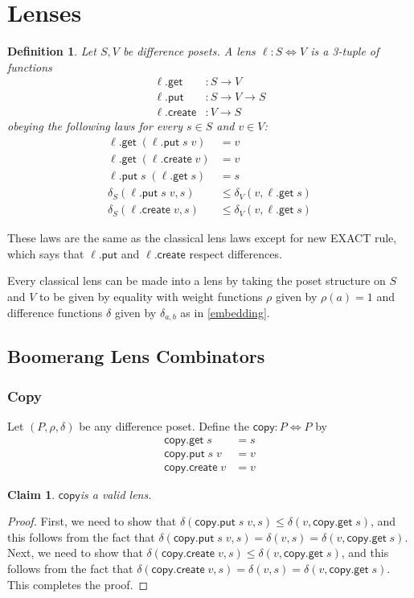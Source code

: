 \documentclass[acmsmall,review,anonymous]{acmart}\settopmatter{printfolios=true,printccs=false,printacmref=false}
\newtheorem{definition}{Definition}
\newtheorem{claim}{Claim}
\newcommand{\kw}[1]{\ensuremath{\mathsf{#1}}}
\newcommand{\get}{\ensuremath{\kw{get}}}
\newcommand{\pput}{\ensuremath{\kw{put}}}
\newcommand{\create}{\ensuremath{\kw{create}}}
\newcommand{\ccopy}{\ensuremath{\kw{copy}}}
\begin{document}
\section{Lenses}
\begin{definition}
Let $S, V$ be difference posets. A lens $\ell : S \Leftrightarrow V$ is a
3-tuple of functions
\begin{align*}
\ell.\get &: S \longrightarrow V\\
\ell.\pput &: S \longrightarrow V \longrightarrow S\\
\ell.\create &: V \longrightarrow S
\end{align*}
obeying the following laws for every $s \in S$ and $v \in V$:
\begin{align*}
\ell.\get \; (\ell.\pput \; s \; v) &= v \tag{PUTGET}\\
\ell.\get \; (\ell.\create \; v) &= v \tag{CREATEGET}\\
\ell.\pput \; s \; (\ell.\get \; s) &= s \tag{GETPUT}\\
\delta_S(\ell.\pput \; s \; v, s) &\leq \delta_V(v, \ell.\get \; s)
\tag{PUTRESPECT}\\
\delta_S(\ell.\create \; v, s) &\leq \delta_V(v, \ell.\get \; s)
\tag{CREATERESPECT}
\end{align*}
\end{definition}
These laws are the same as the classical lens laws except for new EXACT rule,
which says that $\ell.\pput$ and $\ell.\create$ respect differences.

Every classical lens can be made into a lens by taking the poset structure on
$S$ and $V$ to be given by equality with weight functions $\rho$ given by
$\rho(a) = 1$ and difference functions $\delta$ given by $\delta_{a, b}$ as in
\cref{embedding}.
\subsection{Boomerang Lens Combinators}
\subsubsection{Copy}
Let $(P, \rho, \delta)$ be any difference poset. Define the $\ccopy : P
\Leftrightarrow P$ by
\begin{align}
\ccopy.\get \; s &= s\\
\ccopy.\pput \; s \; v &= v\\
\ccopy.\create \; v &= v
\end{align}
\begin{claim}
\ccopy is a valid lens.
\end{claim}
\begin{proof}
First, we need to show that $\delta(\ccopy.\pput \; s \;v, s) \leq \delta(v,
\ccopy.\get \; s) $, and this follows from the fact that $\delta(\ccopy.\pput
\; s \;v, s) = \delta(v, s) = \delta(v, \ccopy.\get \;s)$. Next, we need to show
that $\delta(\ccopy.\create \;v, s) \leq \delta(v, \ccopy.\get \; s)$, and this
follows from the fact that $\delta(\ccopy.\create \;v, s) = \delta(v, s) =
\delta(v, \ccopy.\get \;s)$. This completes the proof.
\end{proof}
\end{document}
